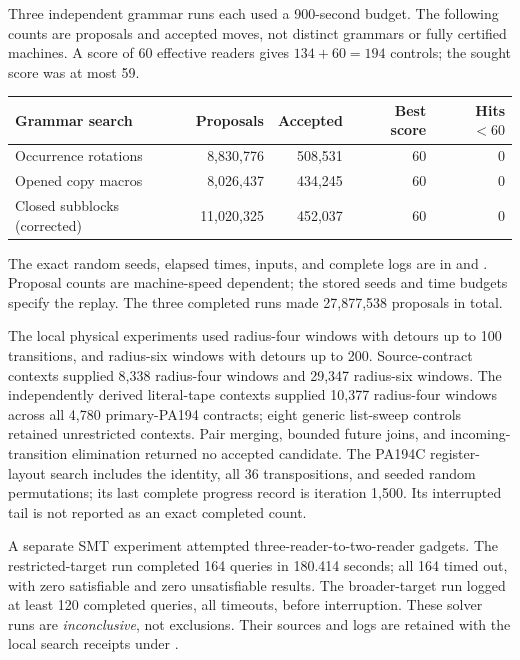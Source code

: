 Three independent grammar runs each used a 900-second budget.  The
following counts are proposals and accepted moves, not distinct grammars
or fully certified machines.  A score of 60 effective readers gives
$134+60=194$ controls; the sought score was at most 59.

\begin{center}\small
\begin{tabular}{@{}lrrrr@{}}
\toprule
Grammar search & Proposals & Accepted & Best score & Hits $<60$\\\midrule
Occurrence rotations&8,830,776&508,531&60&0\\
Opened copy macros&8,026,437&434,245&60&0\\
Closed subblocks (corrected)&11,020,325&452,037&60&0\\
\bottomrule
\end{tabular}
\end{center}

The exact random seeds, elapsed times, inputs, and complete logs are in
 and .  Proposal counts are
machine-speed dependent; the stored seeds and time budgets specify the
replay.  The three completed runs made 27,877,538 proposals in total.

The local physical experiments used radius-four windows with detours up
to 100 transitions, and radius-six windows with detours up to 200.
Source-contract contexts supplied 8,338 radius-four windows and 29,347
radius-six windows.  The independently derived literal-tape contexts
supplied 10,377 radius-four windows across all 4,780 primary-PA194
contracts; eight generic list-sweep controls retained unrestricted
contexts.  Pair merging, bounded future joins, and incoming-transition
elimination returned no accepted candidate.  The PA194C register-layout
search includes the identity, all 36 transpositions, and seeded random
permutations; its last complete progress record is iteration 1,500.
Its interrupted tail is not reported as an exact completed count.

A separate SMT experiment attempted three-reader-to-two-reader gadgets.
The restricted-target run completed 164 queries in 180.414 seconds;
all 164 timed out, with zero satisfiable and zero unsatisfiable results.
The broader-target run logged at least 120 completed queries, all
timeouts, before interruption.  These solver runs are \emph{inconclusive},
not exclusions.  Their sources and logs are retained with the local
search receipts under .

